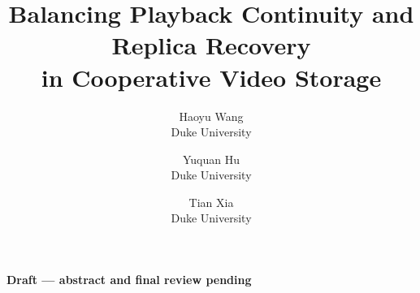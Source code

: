 \documentclass[letterpaper,twocolumn,10pt]{article}
\title{\Large\bf Balancing Playback Continuity and Replica Recovery\\in Cooperative Video Storage}
\author{{\rm Haoyu Wang}\\Duke University
\and {\rm Yuquan Hu}\\Duke University
\and {\rm Tian Xia}\\Duke University}
\date{}
\begin{document}
\maketitle
\begin{center}\textbf{Draft --- abstract and final review pending}\end{center}











\end{document}
